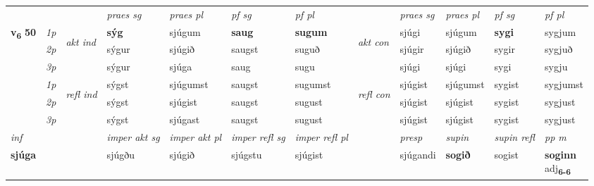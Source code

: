 \begin{longtable}[l]{X>{\footnotesize\itshape}llXXXXlXXXX}
 & &   & \textit{praes sg}  & \textit{praes pl}    & \textit{ pf sg} & \textit{pf pl} & & \textit{praes sg}  & \textit{praes pl}    & \textit{pf sg} & \textit{pf pl }  \\ \cmidrule{4-7} \cmidrule{9-12}
 \multirow{2}{*}{{{\textbf{v{\textsubscript{6}}} \Large{\textbf{50}}}}}  & 1p & \multirow{3}{*}{\begin{turn}{90}\textit{akt ind}\end{turn}} & \textbf{sýg} & sjúgum & \textbf{saug} & \textbf{sugum} & \multirow{3}{*}{\begin{turn}{90}\textit{akt con}\end{turn}} &sjúgi & sjúgum & \textbf{sygi} & sygjum\\*
 & 2p &  &  sýgur  & sjúgið & saugst & suguð & & sjúgir & sjúgið & sygir & sygjuð \\*
 & 3p &  & sýgur & sjúga & saug & sugu & & sjúgi & sjúgi& sygi & sygju \\*
\cmidrule{4-7} \cmidrule{9-12}
 & 1p & \multirow{3}{*}{\begin{turn}{90}\textit{refl ind}\end{turn}}  & sýgst & sjúgumst & saugst & sugumst & \multirow{3}{*}{\begin{turn}{90}\textit{refl con}\end{turn}}  &sjúgist & sjúgumst & sygist & sygjumst \\*
 & 2p &  & sýgst & sjúgist & saugst & sugust & &sjúgist & sjúgist & sygist & sygjust \\*
 & 3p  & & sýgst & sjúgast & saugst & sugust & & sjúgist & sjúgist& sygist & sygjust \\*
\cmidrule{4-7} \cmidrule{9-12}

   {\textit{inf}} & &  & \textit{imper akt sg} & \textit{imper akt pl} & \textit{imper refl sg} & \textit{imper refl pl} && \textit{presp} & \textit{supin} & \textit{supin refl} & \textit{pp m} \\*
  {\textbf{sjúga}} & && sjúgðu  & sjúgið & sjúgstu & sjúgist && sjúgandi &  \textbf{sogið} & sogist & \specialcell{\textbf{soginn} \\ adj\textbf{\textsubscript{6-6}}} \\*

\midrule


\end{longtable}
